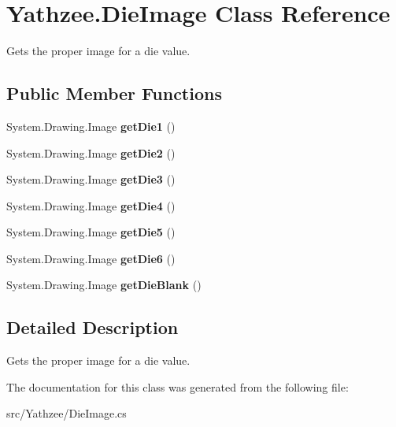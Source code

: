 \hypertarget{class_yathzee_1_1_die_image}{}\section{Yathzee.\+Die\+Image Class Reference}
\label{class_yathzee_1_1_die_image}


Gets the proper image for a die value.  


\subsection*{Public Member Functions}
\begin{DoxyCompactItemize}
\item 
System.\+Drawing.\+Image {\bfseries get\+Die1} ()\hypertarget{class_yathzee_1_1_die_image_a2724ca8f7897a55ffe997ef924394c7e}{}\label{class_yathzee_1_1_die_image_a2724ca8f7897a55ffe997ef924394c7e}

\item 
System.\+Drawing.\+Image {\bfseries get\+Die2} ()\hypertarget{class_yathzee_1_1_die_image_a263559c79673dcfaaed6e32611c52804}{}\label{class_yathzee_1_1_die_image_a263559c79673dcfaaed6e32611c52804}

\item 
System.\+Drawing.\+Image {\bfseries get\+Die3} ()\hypertarget{class_yathzee_1_1_die_image_ad1a3e766145e9b4866088a0774bfa30a}{}\label{class_yathzee_1_1_die_image_ad1a3e766145e9b4866088a0774bfa30a}

\item 
System.\+Drawing.\+Image {\bfseries get\+Die4} ()\hypertarget{class_yathzee_1_1_die_image_a413e19c90b843b4c1ea7a4b4eba824db}{}\label{class_yathzee_1_1_die_image_a413e19c90b843b4c1ea7a4b4eba824db}

\item 
System.\+Drawing.\+Image {\bfseries get\+Die5} ()\hypertarget{class_yathzee_1_1_die_image_a8195f245d22a93c8b57244fbb7721db2}{}\label{class_yathzee_1_1_die_image_a8195f245d22a93c8b57244fbb7721db2}

\item 
System.\+Drawing.\+Image {\bfseries get\+Die6} ()\hypertarget{class_yathzee_1_1_die_image_a320bc5d43dd0400443cfce5d81f57adb}{}\label{class_yathzee_1_1_die_image_a320bc5d43dd0400443cfce5d81f57adb}

\item 
System.\+Drawing.\+Image {\bfseries get\+Die\+Blank} ()\hypertarget{class_yathzee_1_1_die_image_a86d428cf3935a1785df461b2fa710d8f}{}\label{class_yathzee_1_1_die_image_a86d428cf3935a1785df461b2fa710d8f}

\end{DoxyCompactItemize}


\subsection{Detailed Description}
Gets the proper image for a die value. 



The documentation for this class was generated from the following file\+:\begin{DoxyCompactItemize}
\item 
src/\+Yathzee/Die\+Image.\+cs\end{DoxyCompactItemize}
